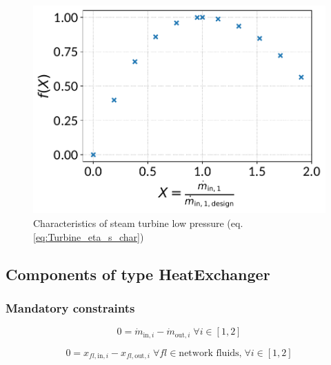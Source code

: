 \documentclass[]{article}
\begin{document}
\begin{minipage}{0.5\textwidth}
\begin{figure}[H]\begin{center}
\includegraphics[width=\textwidth]{figures/Turbine_CharLine_eta_s_char_steam_turbine_low_pressure.pdf}
\caption{Characteristics of steam turbine low pressure (eq. \ref{eq:Turbine_eta_s_char})}
\label{fig:CharLine_eta_s_char_steam turbine low pressure}
\end{center}\end{figure}

\end{minipage}

\subsection{Components of type HeatExchanger}

\subsubsection{Mandatory constraints}

\begin{equation}
\label{eq:HeatExchanger_mass_flow_constraints}
0=\dot{m}_{\mathrm{in,}i}-\dot{m}_{\mathrm{out,}i}\; \forall i \in [1, 2]
\end{equation}

\begin{equation}
\label{eq:HeatExchanger_fluid_constraints}
0=x_{fl\mathrm{,in,}i}-x_{fl\mathrm{,out,}i}\;\forall fl \in\text{network fluids,}\; \forall i \in [1, 2]
\end{equation}
\end{document}
